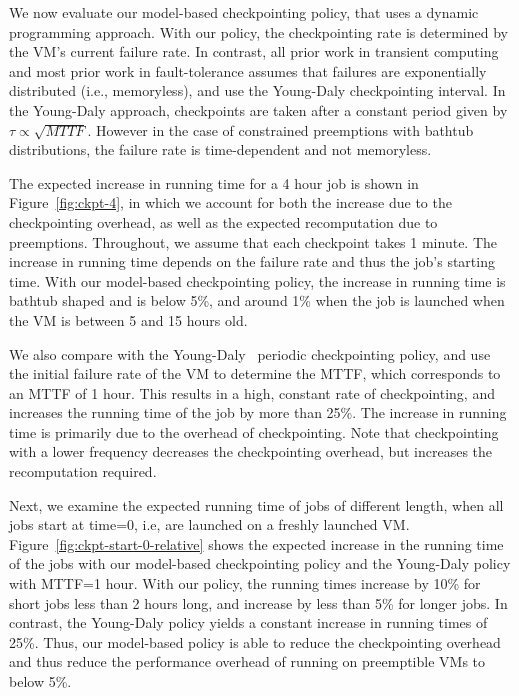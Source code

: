 We now evaluate our model-based checkpointing policy, that uses a dynamic programming approach.
With our policy, the checkpointing rate is determined by the VM's current failure rate.
In contrast, all prior work in transient computing and most prior work in fault-tolerance assumes that failures are exponentially distributed (i.e., memoryless), and use the Young-Daly checkpointing interval.
In the Young-Daly approach, checkpoints are taken after a constant period given by $\tau \propto \sqrt{MTTF}$.
However in the case of constrained preemptions with bathtub distributions, the failure rate is time-dependent and not memoryless. 


The expected increase in running time for a 4 hour job is shown in Figure~\ref{fig:ckpt-4}, in which we account for both the increase due to the checkpointing overhead, as well as the expected recomputation due to preemptions. 
Throughout, we assume that each checkpoint takes 1 minute. 
The increase in running time depends on the failure rate and thus the job's starting time. 
With our model-based checkpointing policy, the increase in running time is bathtub shaped and is below 5\%, and around 1\% when the job is launched when the VM is between 5 and 15 hours old. 

We also compare with the Young-Daly~\cite{daly2006higher} periodic checkpointing policy, and use the initial failure rate of the VM to determine the MTTF, which corresponds to an MTTF of 1 hour. 
This results in a high, constant rate of checkpointing, and increases the running time of the job by more than 25\%.
The increase in running time is primarily due to the overhead of checkpointing. 
Note that checkpointing with a lower frequency decreases the checkpointing overhead, but increases the recomputation required.

Next, we examine the expected running time of jobs of different length, when all jobs start at time=0, i.e, are launched on a freshly launched VM. 
Figure~\ref{fig:ckpt-start-0-relative} shows the expected increase in the running time of the jobs with our model-based checkpointing policy and the Young-Daly policy with MTTF=1 hour.
With our policy, the running times increase by 10\% for short jobs less than 2 hours long, and increase by less than 5\% for longer jobs.
In contrast, the Young-Daly policy yields a constant increase in running times of 25\%. 
Thus, our model-based policy is able to reduce the checkpointing overhead and thus reduce the performance overhead of running on preemptible VMs to below 5\%. 

